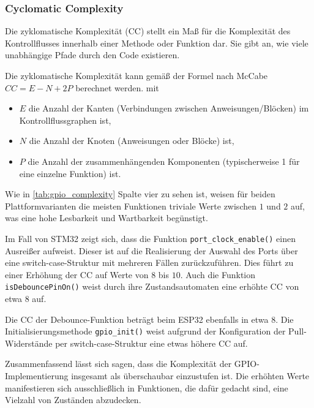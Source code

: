 \subsubsection{Cyclomatic Complexity}
Die zyklomatische Komplexität (CC) stellt ein Maß für die Komplexität des Kontrollflusses innerhalb einer Methode oder Funktion dar. Sie gibt an, wie viele unabhängige Pfade durch den Code existieren. 

Die zyklomatische Komplexität kann gemäß der Formel nach McCabe\cite{McCabeMetrik} $CC= E - N + 2P$ berechnet werden.
mit 
\begin{itemize}
	\item $E$ die Anzahl der Kanten (Verbindungen zwischen Anweisungen/Blöcken) im Kontrollflussgraphen ist,
	\item $N$ die Anzahl der Knoten (Anweisungen oder Blöcke) ist,
	\item $P$ die Anzahl der zusammenhängenden Komponenten (typischerweise 1 für eine einzelne Funktion) ist.
\end{itemize}

Wie in \cref{tab:gpio_complexity} Spalte vier zu sehen ist, weisen für beiden Plattformvarianten die meisten Funktionen triviale Werte zwischen $1$ und $2$ auf, was eine hohe Lesbarkeit und Wartbarkeit begünstigt.

Im Fall von STM32 zeigt sich, dass die Funktion \texttt{port\_clock\_enable()} einen Ausreißer aufweist. 
Dieser ist auf die Realisierung der Auswahl des Ports über eine switch-case-Struktur mit mehreren Fällen zurückzuführen. 
Dies führt zu einer Erhöhung der CC auf Werte von $8$ bis $10$. 
Auch die Funktion \texttt{isDebouncePinOn()} weist durch ihre Zustandsautomaten eine erhöhte CC von etwa $8$ auf.

Die CC der Debounce-Funktion beträgt beim ESP32 ebenfalls in etwa $8$. 
Die Initialisierungsmethode \texttt{gpio\_init()} weist aufgrund der Konfiguration der Pull-Widerstände per switch-case-Struktur eine etwas höhere CC auf.

Zusammenfassend lässt sich sagen, dass die Komplexität der GPIO-Implementierung insgesamt als überschaubar einzustufen ist. 
Die erhöhten Werte manifestieren sich ausschließlich in Funktionen, die dafür gedacht sind, eine Vielzahl von Zuständen abzudecken.


